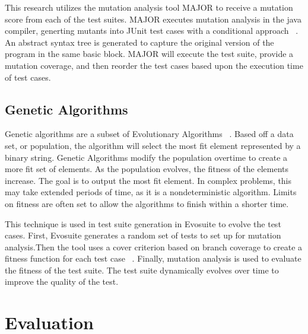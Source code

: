 \documentclass[conference]{IEEEtran}
\begin{document}
This research utilizes the mutation analysis tool MAJOR to receive a mutation score from each of the test suites. MAJOR executes mutation analysis in the java compiler, generting mutants into JUnit test cases with a conditional approach ~\cite{MAJOR:Just:2011}. An abstract syntax tree is generated to capture the original version of the program in the same basic block. MAJOR will execute the test suite, provide a mutation coverage, and then reorder the test cases based upon the execution time of test cases. 

\subsection{Genetic Algorithms}
Genetic algorithms are a subset of Evolutionary Algorithms ~\cite{Pandey:2012:GAC:2381716.2381766}.  Based off a data set, or population, the algorithm will select the most fit element represented by a binary string. Genetic Algorithms modify the population overtime to create a more fit set of elements. As the population evolves, the fitness of the elements increase. The goal is to output the most fit element. In complex problems, this may take extended periods of time, as it is a nondeterministic algorithm. Limits on fitness are often set to allow the algorithms to finish within a shorter time.

This technique is used in test suite generation in Evosuite to evolve the test cases. First, Evosuite generates a random set of tests to set up for mutation analysis.Then the tool uses a cover criterion based on branch coverage to create a fitness function for each test case ~\cite{Whole_Test_Suite_Generation:Fraser}. Finally, mutation analysis is used to evaluate the fitness of the test suite. The test suite dynamically evolves over time to improve the quality of the test. 

\section{Evaluation}
\label{sec:evaluation}
\end{document}
